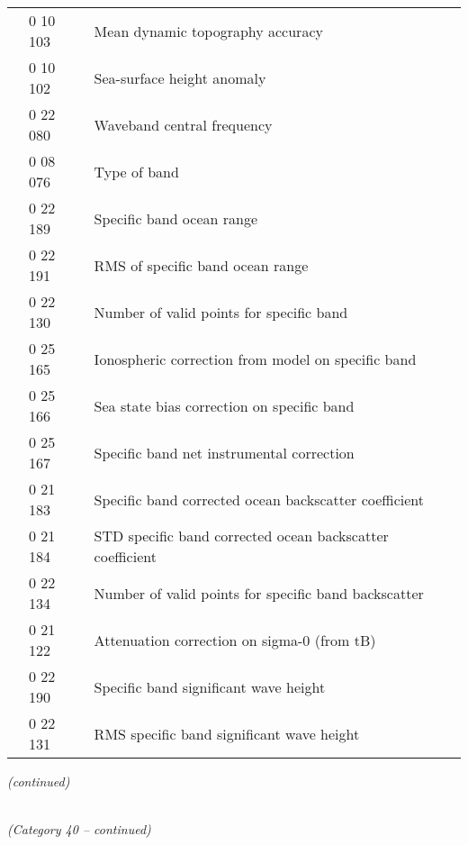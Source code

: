 \begin{longtable}[]{@{}llll@{}}
& 0 10 103 & Mean dynamic topography accuracy &\tabularnewline
& 0 10 102 & Sea-surface height anomaly &\tabularnewline
& 0 22 080 & Waveband central frequency &\tabularnewline
& 0 08 076 & Type of band &\tabularnewline
& 0 22 189 & Specific band ocean range &\tabularnewline
& 0 22 191 & RMS of specific band ocean range &\tabularnewline
& 0 22 130 & Number of valid points for specific band &\tabularnewline
& 0 25 165 & Ionospheric correction from model on specific band &\tabularnewline
& 0 25 166 & Sea state bias correction on specific band &\tabularnewline
& 0 25 167 & Specific band net instrumental correction &\tabularnewline
& 0 21 183 & Specific band corrected ocean backscatter coefficient &\tabularnewline
& 0 21 184 & STD specific band corrected ocean backscatter coefficient &\tabularnewline
& 0 22 134 & Number of valid points for specific band backscatter &\tabularnewline
& 0 21 122 & Attenuation correction on sigma-0 (from tB) &\tabularnewline
& 0 22 190 & Specific band significant wave height &\tabularnewline
& 0 22 131 & RMS specific band significant wave height &\tabularnewline
\bottomrule
\end{longtable}

\emph{(continued)}

\emph{\\
(Category 40 -- continued)}

